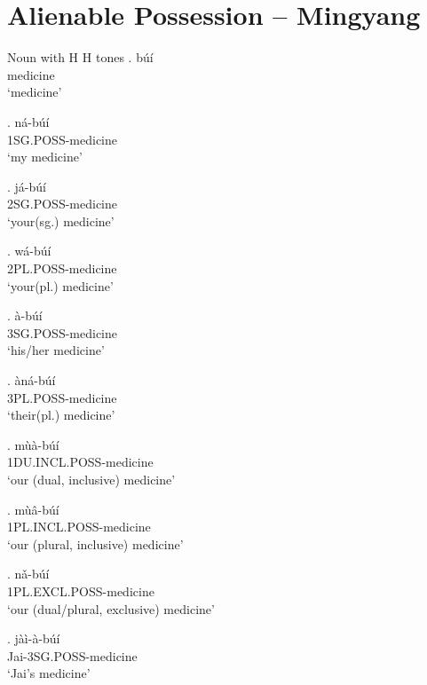 \documentclass{assets/fieldnotes}
\newcommand{\mb}[1]{\textcolor{Dandelion}{#1}}
\begin{document}
\section{Alienable Possession -- Mingyang}
\mb{Noun with H H tones}
\exg. búí\\
    medicine\\
    `medicine'

\exg. ná-búí\\
    1SG.POSS-medicine\\
    `my medicine'

\exg. já-búí\\
    2SG.POSS-medicine\\
    `your(sg.) medicine'

\exg. wá-búí\\
    2PL.POSS-medicine\\
    `your(pl.) medicine'

\exg. à-búí\\
    3SG.POSS-medicine\\
    `his/her medicine'

\exg. àná-búí\\
    3PL.POSS-medicine\\
    `their(pl.) medicine'

\exg. mùà-búí\\
    1DU.INCL.POSS-medicine\\
    `our (dual, inclusive) medicine'

\exg. mùâ-búí\\
    1PL.INCL.POSS-medicine\\
    `our (plural, inclusive) medicine'

\exg. nǎ-búí\\
    1PL.EXCL.POSS-medicine\\
    `our (dual/plural, exclusive) medicine'


\exg. jàì-à-búí\\
    Jai-3SG.POSS-medicine\\
    `Jai's medicine'
\end{document}
